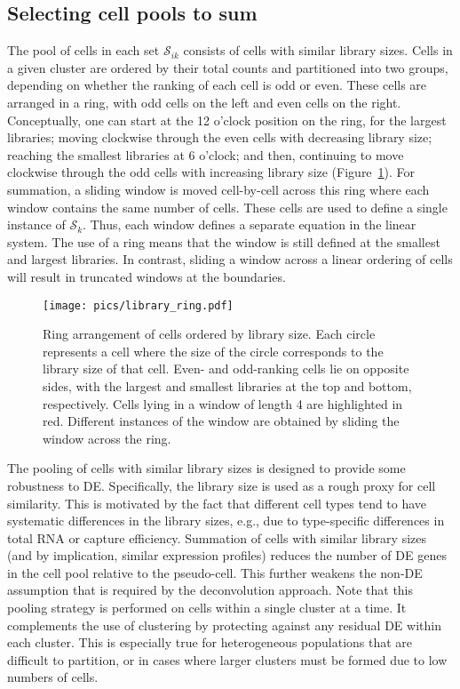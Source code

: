\documentclass{article}
\begin{document}
\subsection{Selecting cell pools to sum}
The pool of cells in each set $\mathcal{S}_{ik}$ consists of cells with similar library sizes.
Cells in a given cluster are ordered by their total counts and partitioned into two groups, depending on whether the ranking of each cell is odd or even.
These cells are arranged in a ring, with odd cells on the left and even cells on the right.
Conceptually, one can start at the 12 o'clock position on the ring, for the largest libraries; moving clockwise through the even cells with decreasing library size;
reaching the smallest libraries at 6 o'clock; and then, continuing to move clockwise through the odd cells with increasing library size (Figure~\ref{fig:library_ring}).
For summation, a sliding window is moved cell-by-cell across this ring where each window contains the same number of cells.
These cells are used to define a single instance of $\mathcal{S}_{k}$.
Thus, each window defines a separate equation in the linear system.
The use of a ring means that the window is still defined at the smallest and largest libraries.
In contrast, sliding a window across a linear ordering of cells will result in truncated windows at the boundaries.

\begin{figure}[bt]
    \begin{center}
        \texttt{[image: pics/library\_ring.pdf]}
    \end{center}
    \caption{
        Ring arrangement of cells ordered by library size.
        Each circle represents a cell where the size of the circle corresponds to the library size of that cell.
        Even- and odd-ranking cells lie on opposite sides, with the largest and smallest libraries at the top and bottom, respectively.
        Cells lying in a window of length 4 are highlighted in red.
        Different instances of the window are obtained by sliding the window across the ring.
    }
    \label{fig:library_ring}
\end{figure}

The pooling of cells with similar library sizes is designed to provide some robustness to DE.
Specifically, the library size is used as a rough proxy for cell similarity.
This is motivated by the fact that different cell types tend to have systematic differences in the library sizes, 
    e.g., due to type-specific differences in total RNA or capture efficiency.
Summation of cells with similar library sizes (and by implication, similar expression profiles) reduces the number of DE genes in the cell pool relative to the pseudo-cell.
This further weakens the non-DE assumption that is required by the deconvolution approach.
Note that this pooling strategy is performed on cells within a single cluster at a time.
It complements the use of clustering by protecting against any residual DE within each cluster.
This is especially true for heterogeneous populations that are difficult to partition, or in cases where larger clusters must be formed due to low numbers of cells.
\end{document}
